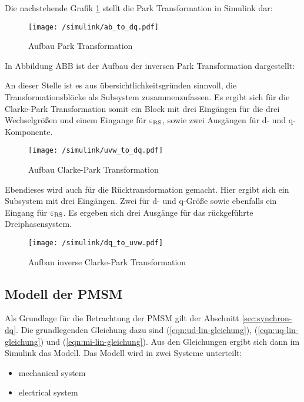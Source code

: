 Die nachstehende Grafik \ref{fig:uvw_to_ab} stellt die Park Transformation in Simulink dar:

\begin{figure}[h]
	\centering
	\texttt{[image: /simulink/ab\_to\_dq.pdf]}
	\label{fig:uvw_to_ab}
	\caption{Aufbau Park Transformation}
\end{figure}

In Abbildung ABB ist der Aufbau der inversen Park Transformation dargestellt:


An dieser Stelle ist es aus übersichtlichkeitsgründen sinnvoll, die Transformationsblöcke als Subsystem zusammenzufassen.
Es ergibt sich für die Clarke-Park Transformation somit ein Block mit drei Eingängen für die drei Wechselgrößen und einem Eingange für $\varepsilon_{\mathrm{RS}}$, sowie zwei Ausgängen für d- und q-Komponente.

\begin{figure}[h]
	\centering
	\texttt{[image: /simulink/uvw\_to\_dq.pdf]}
	\label{fig:uvw_to_dq}
	\caption{Aufbau Clarke-Park Transformation}
\end{figure}

Ebendieses wird auch für die Rücktransformation gemacht. 
Hier ergibt sich ein Subsystem mit drei Eingängen. 
Zwei für d- und q-Größe sowie ebenfalls ein Eingang für $\varepsilon_{\mathrm{RS}}$.
Es ergeben sich drei Ausgänge für das rückgeführte Dreiphasensystem.

\begin{figure}[h]
	\centering
	\texttt{[image: /simulink/dq\_to\_uvw.pdf]}
	\label{fig:dq_to_uvw}
	\caption{Aufbau inverse Clarke-Park Transformation}
\end{figure}


\subsection{Modell der PMSM}

Als Grundlage für die Betrachtung der PMSM gilt der Abschnitt \ref{sec:synchron-dq}.
Die grundlegenden Gleichung dazu sind (\ref{eqn:ud-lin-gleichung}), (\ref{eqn:uq-lin-gleichung}) und (\ref{eqn:mi-lin-gleichung}).
Aus den Gleichungen ergibt sich dann im Simulink das Modell.
Das Modell wird in zwei Systeme unterteilt:

\begin{itemize}
	\item mechanical system
	\item electrical system
\end{itemize}

